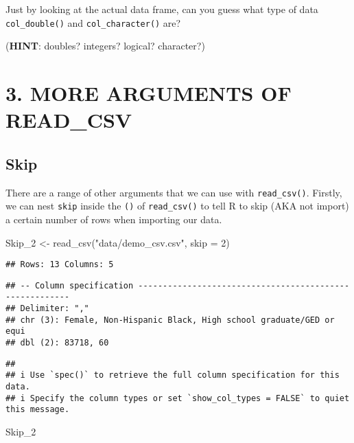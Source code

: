 \documentclass[
]{book}
\newenvironment{Shaded}{\begin{snugshade}}{\end{snugshade}}
\newcommand{\AttributeTok}[1]{\textcolor[rgb]{0.77,0.63,0.00}{#1}}
\newcommand{\DecValTok}[1]{\textcolor[rgb]{0.00,0.00,0.81}{#1}}
\newcommand{\FunctionTok}[1]{\textcolor[rgb]{0.00,0.00,0.00}{#1}}
\newcommand{\NormalTok}[1]{#1}
\newcommand{\OtherTok}[1]{\textcolor[rgb]{0.56,0.35,0.01}{#1}}
\newcommand{\StringTok}[1]{\textcolor[rgb]{0.31,0.60,0.02}{#1}}
\begin{document}
Just by looking at the actual data frame, can you guess what type of data \texttt{col\_double()} and \texttt{col\_character()} are?

(\textbf{HINT}: doubles? integers? logical? character?)

\hypertarget{more-arguments-of-read_csv}{%
\section{3. MORE ARGUMENTS OF READ\_CSV}\label{more-arguments-of-read_csv}}

\hypertarget{skip}{%
\subsection{Skip}\label{skip}}

There are a range of other arguments that we can use with \texttt{read\_csv()}. Firstly, we can nest \texttt{skip} inside the \texttt{()} of \texttt{read\_csv()} to tell R to skip (AKA not import) a certain number of rows when importing our data.

\begin{Shaded}
\begin{Highlighting}[]
\NormalTok{Skip\_2 }\OtherTok{\textless{}{-}} \FunctionTok{read\_csv}\NormalTok{(}\StringTok{"data/demo\_csv.csv"}\NormalTok{, }\AttributeTok{skip =} \DecValTok{2}\NormalTok{)}
\end{Highlighting}
\end{Shaded}

\begin{verbatim}
## Rows: 13 Columns: 5
\end{verbatim}

\begin{verbatim}
## -- Column specification --------------------------------------------------------
## Delimiter: ","
## chr (3): Female, Non-Hispanic Black, High school graduate/GED or equi
## dbl (2): 83718, 60
\end{verbatim}

\begin{verbatim}
## 
## i Use `spec()` to retrieve the full column specification for this data.
## i Specify the column types or set `show_col_types = FALSE` to quiet this message.
\end{verbatim}

\begin{Shaded}
\begin{Highlighting}[]
\NormalTok{Skip\_2}
\end{Highlighting}
\end{Shaded}
\end{document}
